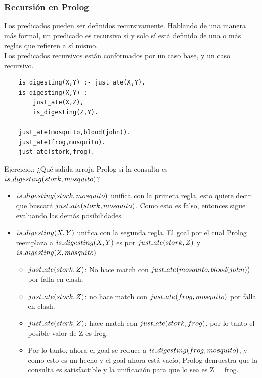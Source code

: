 \documentclass[10pt,a4paper]{article}
\begin{document}
\subsubsection*{Recursión en Prolog}
Los predicados pueden ser definidos recursivamente. Hablando de una manera más formal, un predicado es recursivo sí y solo sí está definido de una o más reglas que refieren a sí mismo. \\
Los predicados recursivos están conformados por un caso base, y un caso recursivo. 
\begin{lstlisting}
    is_digesting(X,Y) :- just_ate(X,Y).
    is_digesting(X,Y) :-
        just_ate(X,Z),
        is_digesting(Z,Y).

    just_ate(mosquito,blood(john)).
    just_ate(frog,mosquito).
    just_ate(stork,frog).
\end{lstlisting}
Ejercicio.: ¿Qué salida arroja Prolog si la consulta es $is\mathunderscore digesting(stork, mosquito)$?
\begin{itemize}
    \item $is\mathunderscore digesting(stork, mosquito)$ unifica con la primera regla, esto quiere decir que buscará $just\mathunderscore ate(stork, mosquito)$. Como esto es falso, entonces sigue evaluando las demás posibilidades.
    \item $is\mathunderscore digesting(X,Y)$ unifica con la segunda regla. El goal por el cual Prolog reemplaza a $is\mathunderscore digesting(X,Y)$ es por $just\mathunderscore ate(stork, Z)$ y $is\mathunderscore digesting(Z, mosquito)$.
    \begin{itemize}
        \item $just\mathunderscore ate(stork, Z)$: No hace match con $just\mathunderscore ate(mosquito, blood(john))$ por falla en clash.
        \item $just\mathunderscore ate(stork, Z)$: no hace match con $just\mathunderscore ate(frog, mosquito)$ por falla en clash.
        \item $just\mathunderscore ate(stork, Z)$: hace match con $just\mathunderscore ate(stork, frog)$, por lo tanto el posible valor de Z es frog. 
        \item Por lo tanto, ahora el goal se reduce a $is\mathunderscore  digesting(frog, mosquito)$, y como esto es un hecho y el goal ahora está vacío, Prolog demuestra que la consulta es satisfactible y la unificación para que lo sea es Z = frog.
    \end{itemize}
\end{itemize}
\end{document}
